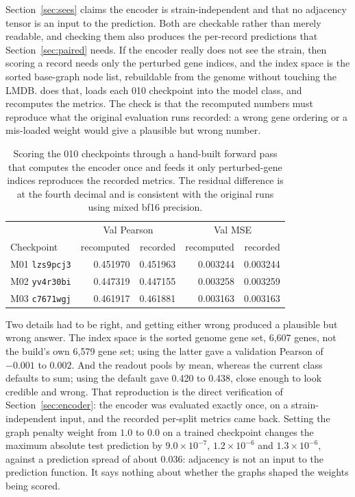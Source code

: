 Section~\ref{sec:sees} claims the encoder is strain-independent and that no
adjacency tensor is an input to the prediction. Both are checkable rather than
merely readable, and checking them also produces the per-record predictions that
Section~\ref{sec:paired} needs. If the encoder really does not see the strain, then
scoring a record needs only the perturbed gene indices, and the index space is the
sorted base-graph node list, rebuildable from the genome without touching the
LMDB. 
does that, loads each 010 checkpoint into the model class, and recomputes the
metrics. The check is that the recomputed numbers must reproduce what the original
evaluation runs recorded: a wrong gene ordering or a mis-loaded weight would give a
plausible but wrong number.

\begin{table}[htbp]
\centering
\footnotesize
\caption{Scoring the 010 checkpoints through a hand-built forward pass that
computes the encoder once and feeds it only perturbed-gene indices reproduces the
recorded metrics. The residual difference is at the fourth decimal and is
consistent with the original runs using mixed bf16 precision.}
\label{tab:repro}
\begin{tabular}{lrrrr}
\toprule
& \multicolumn{2}{c}{Val Pearson} & \multicolumn{2}{c}{Val MSE} \\
Checkpoint & recomputed & recorded & recomputed & recorded \\
\midrule
M01 \texttt{lzs9pcj3} & 0.451970 & 0.451963 & 0.003244 & 0.003244 \\
M02 \texttt{yv4r30bi} & 0.447319 & 0.447155 & 0.003258 & 0.003259 \\
M03 \texttt{c7671wgj} & 0.461917 & 0.461881 & 0.003163 & 0.003163 \\
\bottomrule
\end{tabular}
\end{table}

Two details had to be right, and getting either wrong produced a plausible but
wrong answer. The index space is the sorted genome gene set, 6{,}607 genes, not the
build's own 6{,}579 gene set; using the latter gave a validation Pearson of $-0.001$
to $0.002$. And the readout pools by mean, whereas the current class defaults to
sum; using the default gave 0.420 to 0.438, close enough to look credible and wrong.
That reproduction is the direct verification of Section~\ref{sec:encoder}: the
encoder was evaluated exactly once, on a strain-independent input, and the recorded
per-split metrics came back. Setting the graph penalty weight from $1.0$ to $0.0$
on a trained checkpoint changes the maximum absolute test prediction by
$9.0 \times 10^{-7}$, $1.2 \times 10^{-6}$ and $1.3 \times 10^{-6}$, against a
prediction spread of about $0.036$: adjacency is not an input to the prediction
function. It says nothing about whether the graphs shaped the weights being scored.

